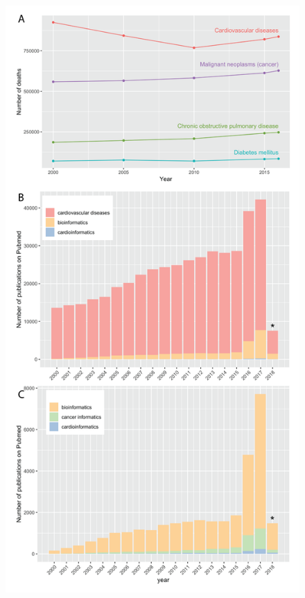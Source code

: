 \documentclass[letter]{bioinfo}
\begin{document}
\begin{figure}
	\centering
	\includegraphics[width=1\linewidth]{figure1}

\end{figure}
\end{document}
